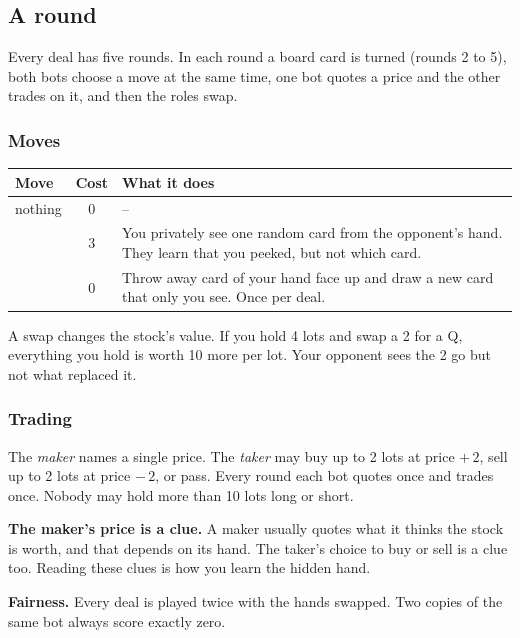\subsection{A round}

Every deal has five rounds. In each round a board card is turned (rounds 2 to 5), both bots
choose a move at the same time, one bot quotes a price and the other trades on it, and then the
roles swap.

\subsubsection{Moves}

\begin{center}
\begin{tabularx}{\linewidth}{@{}l c L@{}}
\toprule
\textbf{Move} & \textbf{Cost} & \textbf{What it does} \\
\midrule
nothing & 0 & -- \\
 & 3 & You privately see one random card from the opponent's hand. They learn
  that you peeked, but not which card. \\
 & 0 & Throw away card  of your hand face up and draw a new card that
  only you see. Once per deal. \\
\bottomrule
\end{tabularx}
\end{center}

A swap changes the stock's value. If you hold 4 lots and swap a 2 for a Q, everything you hold
is worth 10 more per lot. Your opponent sees the 2 go but not what replaced it.

\subsubsection{Trading}

The \emph{maker} names a single price. The \emph{taker} may buy up to 2 lots at price $+\,2$,
sell up to 2 lots at price $-\,2$, or pass. Every round each bot quotes once and trades once.
Nobody may hold more than 10 lots long or short.

\textbf{The maker's price is a clue.} A maker usually quotes what it thinks the stock is worth,
and that depends on its hand. The taker's choice to buy or sell is a clue too. Reading these
clues is how you learn the hidden hand.

\textbf{Fairness.} Every deal is played twice with the hands swapped. Two copies of the same
bot always score exactly zero.

